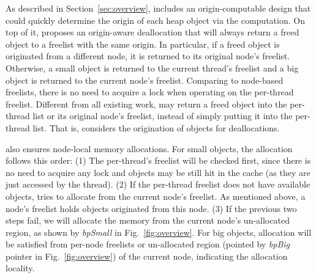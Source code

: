 As described in Section~\ref{sec:overview}, \NM{} includes an origin-computable design that could quickly determine the origin of each heap object via the computation. 
On top of it, \NM{} proposes an origin-aware deallocation that will always return a freed object to a freelist with the same origin. In particular, if a freed object is originated from a different node, it is returned to its original node's  freelist. Otherwise, a small object is returned to the current thread's freelist and a big object is returned to the current node's freelist. Comparing to node-based freelists, there is no need to acquire a lock when operating on the per-thread freelist. Different from all existing work, \NM{} may return a freed object into the per-thread list or its original node's freelist, instead of simply putting it into the per-thread list. That is, \NM{} considers the origination of objects for deallocations. 

\NM{} also ensures node-local memory allocations. For small objects, the allocation follows this order: (1) The per-thread's freelist will be checked first, since there is no need to acquire any lock and objects may be still hit in the cache (as they are just accessed by the thread). (2) If the per-thread freelist does not have available objects, \NM{} tries to allocate from the current node's freelist. As mentioned above, a node's freelist holds objects originated from this node. (3) If the previous two steps fail,  we will allocate the memory from the current node's un-allocated region, as shown by \textit{bpSmall} in Fig.~\ref{fig:overview}. 
For big objects, allocation will be satisfied from per-node freelists or un-allocated region (pointed by \textit{bpBig} pointer in Fig.~\ref{fig:overview}) of the current node, indicating the allocation locality. 
